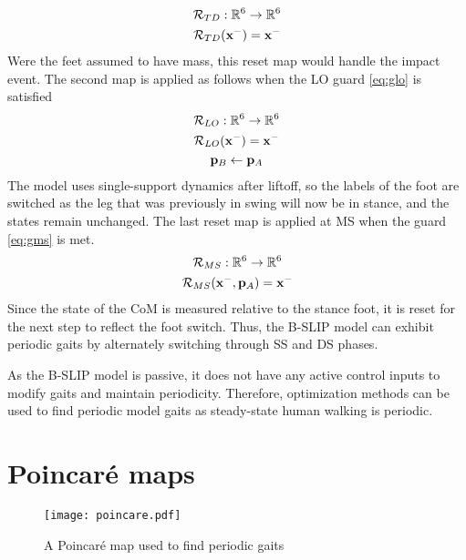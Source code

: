 \begin{gather}
	\mathcal{R}_{TD}:\mathbb{R}^6 \rightarrow \mathbb{R}^6 \nonumber \\ 
	\mathcal{R}_{TD}(\mathbf{x}^-) = \mathbf{x}^- 
\end{gather}
Were the feet assumed to have mass, this reset map would handle the impact event. The second map is applied as follows when the LO guard \eqref{eq:glo} is satisfied
\begin{gather}
	\mathcal{R}_{LO}:\mathbb{R}^6 \rightarrow \mathbb{R}^6 \nonumber \\ 
	\mathcal{R}_{LO}(\mathbf{x}^-) = \mathbf{x}^- \\
	\mathbf{p}_B \leftarrow \mathbf{p}_A \nonumber
\end{gather}
The model uses single-support dynamics after liftoff, so the labels of the foot are switched as the leg that was previously in swing will now be in stance, and the states remain unchanged. The last reset map is applied at MS when the guard \eqref{eq:gms} is met.
%
\begin{gather}
	\mathcal{R}_{MS}:\mathbb{R}^6 \rightarrow \mathbb{R}^6 \nonumber \\ 
	\mathcal{R}_{MS}(\mathbf{x}^- ,\mathbf{p}_{A}) = \mathbf{x}^- 
\end{gather}
%
%
Since the state of the CoM is measured relative to the stance foot, it is reset for the next step to reflect the foot switch. Thus, the B-SLIP model can exhibit periodic gaits by alternately switching through SS and DS phases.

As the B-SLIP model is passive, it does not have any active control inputs to modify gaits and maintain periodicity. Therefore, optimization methods can be used to find periodic model gaits \cite{strogatz2018nonlinear,garcia1998simplest} as steady-state human walking is periodic. 

\section{Poincar\'e maps}

\begin{figure}
	\centering
	\texttt{[image: poincare.pdf]}
	\caption{A Poincar\'e map used to find periodic gaits}\label{fig:poincare}
\end{figure}

